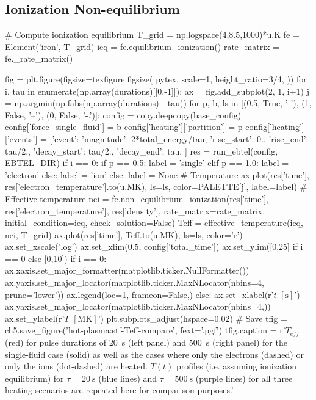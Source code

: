 \subsection{Ionization Non-equilibrium}\label{hot-plasma:subsec:nei_res}

\begin{pycode}[chapter5]
# Compute ionization equilibrium
T_grid = np.logspace(4,8.5,1000)*u.K
fe = Element('iron', T_grid)
ieq = fe.equilibrium_ionization()
rate_matrix = fe._rate_matrix()
\end{pycode}

\begin{pycode}[chapter5]
fig = plt.figure(figsize=texfigure.figsize(
    pytex,
    scale=1,
    height_ratio=3/4,
))
for i, tau in enumerate(np.array(durations)[[0,-1]]):
    ax = fig.add_subplot(2, 1, i+1)
    j = np.argmin(np.fabs(np.array(durations) - tau))
    for p, b, ls in [(0.5, True, '-'), (1, False, '--'), (0, False, '-.')]:
        config = copy.deepcopy(base_config)
        config['force_single_fluid'] = b
        config['heating']['partition'] = p
        config['heating']['events'] = [{'event': {
            'magnitude': 2*total_energy/tau,
            'rise_start': 0.,
            'rise_end': tau/2.,
            'decay_start': tau/2.,
            'decay_end': tau,
        }}]
        res = run_ebtel(config, EBTEL_DIR)
        if i == 0:
            if p == 0.5:
                label = 'single'
            elif p == 1.0:
                label = 'electron'
            else:
                label = 'ion'
        else:
            label = None
        # Temperature
        ax.plot(res['time'], res['electron_temperature'].to(u.MK),
                ls=ls, color=PALETTE[j], label=label)
        # Effective temperature
        nei = fe.non_equilibrium_ionization(res['time'], res['electron_temperature'], res['density'],
                                            rate_matrix=rate_matrix, initial_condition=ieq,
                                            check_solution=False)
        Teff = effective_temperature(ieq, nei, T_grid)
        ax.plot(res['time'], Teff.to(u.MK), ls=ls, color='r')
    ax.set_xscale('log')
    ax.set_xlim(0.5, config['total_time'])
    ax.set_ylim([0,25] if i == 0 else [0,10])
    if i == 0:
        ax.xaxis.set_major_formatter(matplotlib.ticker.NullFormatter())
        ax.yaxis.set_major_locator(matplotlib.ticker.MaxNLocator(nbins=4, prune='lower'))
        ax.legend(loc=1, frameon=False,)
    else:
        ax.set_xlabel(r'$t$ $[\si{\second}]$')
        ax.yaxis.set_major_locator(matplotlib.ticker.MaxNLocator(nbins=4,))
    ax.set_ylabel(r'$T$ $[\si{\mega\kelvin}]$')
plt.subplots_adjust(hspace=0.02)
# Save
tfig = ch5.save_figure('hot-plasma:stf-Teff-compare', fext='.pgf')
tfig.caption = r'$T_{eff}$ (red) for pulse durations of \SI{20}{\second} (left panel) and \SI{500}{\second} (right panel) for the single-fluid case (solid) as well as the cases where only the electrons (dashed) or only the ions (dot-dashed) are heated. $T(t)$ profiles (i.e. assuming ionization equilibrium) for $\tau=\SI{20}{\second}$ (blue lines) and $\tau=\SI{500}{\second}$ (purple lines) for all three heating scenarios are repeated here for comparison purposes.'
\end{pycode}
